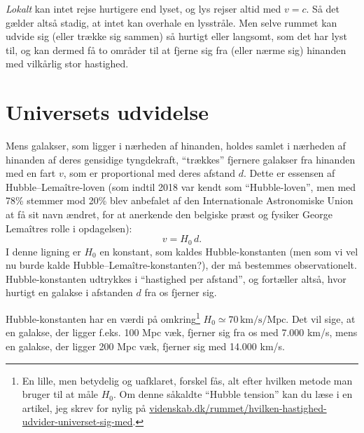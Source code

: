 \documentclass[useAMS,danish]{aa}
\def\vrec{\mbox{$v$}}
\begin{document}
\emph{Lokalt} kan intet rejse hurtigere end lyset, og lys rejser altid med $v=c$.
Så det gælder altså stadig, at intet kan overhale en lysstråle.
Men selve rummet kan udvide sig (eller trække sig sammen) så hurtigt eller langsomt, som det har lyst til, og kan dermed få to områder til at fjerne sig fra (eller nærme sig) hinanden med vilkårlig stor hastighed.

\section{Universets udvidelse}
\label{sec:udvidelse}

Mens galakser, som ligger i nærheden af hinanden, holdes samlet i nærheden af hinanden af deres gensidige tyngdekraft, ``trækkes'' fjernere galakser fra hinanden med en fart \vrec, som er proportional med deres afstand $d$.
Dette er essensen af Hubble--Lemaître-loven (som indtil 2018 var kendt som ``Hubble-loven'', men med 78\% stemmer mod 20\% blev anbefalet af den Internationale Astronomiske Union at få sit navn ændret, for at anerkende den belgiske præst og fysiker George Lemaîtres rolle i opdagelsen):
\begin{equation}
    \label{eq:hubble}
    \vrec = H_0 \, d.
\end{equation}
I denne ligning er $H_0$ en konstant, som kaldes Hubble-konstanten (men som vi vel nu burde kalde Hubble--Lemaître-konstanten?), der må bestemmes observationelt.
Hubble-konstanten udtrykkes i ``hastighed per afstand'', og fortæller altså, hvor hurtigt en galakse i afstanden $d$ fra os fjerner sig.
%
\begin{figure}
    \caption*{{\sf {}}}
\end{figure}
%
Hubble-konstanten har en værdi på omkring\footnote{En lille, men betydelig og uafklaret, forskel fås, alt efter hvilken metode man bruger til at måle $H_0$. Om denne såkaldte ``Hubble tension'' kan du læse i en artikel, jeg skrev for nylig på \href{https://videnskab.dk/rummet/hvilken-hastighed-udvider-universet-sig-med}{videnskab.dk/rummet/hvilken-hastighed-udvider-universet-sig-med}.} 
$H_0 \simeq 70 \,\mathrm{km}/\mathrm{s}/\mathrm{Mpc}$.
Det vil sige, at en galakse, der ligger f.eks. 100 Mpc væk, fjerner sig fra os med 7.000 km/s, mens en galakse, der ligger 200 Mpc væk, fjerner sig med 14.000 km/s.
\end{document}
